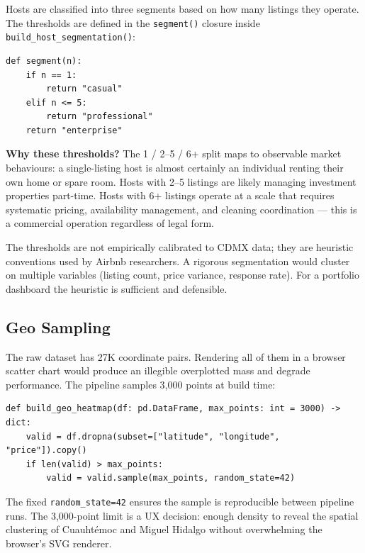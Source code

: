 Hosts are classified into three segments based on how many listings they operate.
The thresholds are defined in the \texttt{segment()} closure inside
\texttt{build\_host\_segmentation()}:

\begin{lstlisting}[style=python, caption={Host segmentation thresholds (lines 109--113)}]
def segment(n):
    if n == 1:
        return "casual"
    elif n <= 5:
        return "professional"
    return "enterprise"
\end{lstlisting}

\begin{decisionbox}
  \textbf{Why these thresholds?} The 1 / 2--5 / 6+ split maps to observable
  market behaviours: a single-listing host is almost certainly an individual renting
  their own home or spare room. Hosts with 2--5 listings are likely managing
  investment properties part-time. Hosts with 6+ listings operate at a scale that
  requires systematic pricing, availability management, and cleaning coordination
  — this is a commercial operation regardless of legal form.

  The thresholds are not empirically calibrated to CDMX data; they are heuristic
  conventions used by Airbnb researchers. A rigorous segmentation would cluster on
  multiple variables (listing count, price variance, response rate). For a portfolio
  dashboard the heuristic is sufficient and defensible.
\end{decisionbox}

\subsection{Geo Sampling}

The raw dataset has 27K coordinate pairs. Rendering all of them in a browser scatter
chart would produce an illegible overplotted mass and degrade performance. The
pipeline samples 3,000 points at build time:

\begin{lstlisting}[style=python, caption={Geo sampling in \filepath{airbnb\_etl.py} (lines 65--68)}]
def build_geo_heatmap(df: pd.DataFrame, max_points: int = 3000) -> dict:
    valid = df.dropna(subset=["latitude", "longitude", "price"]).copy()
    if len(valid) > max_points:
        valid = valid.sample(max_points, random_state=42)
\end{lstlisting}

The fixed \texttt{random\_state=42} ensures the sample is reproducible between
pipeline runs. The 3,000-point limit is a UX decision: enough density to reveal
the spatial clustering of Cuauhtémoc and Miguel Hidalgo without overwhelming the
browser's SVG renderer.

